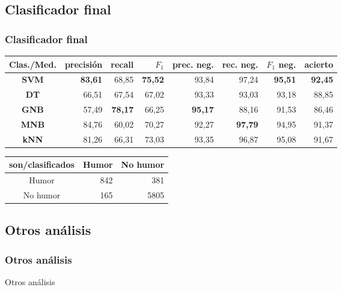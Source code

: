 \subsection{Clasificador final}
\begin{frame}
    \frametitle{Clasificador final}

    \begin{center}
        \scriptsize

        \begin{tabular}{ c | r | r | r | r | r | r | r }
            \textbf{Clas./Med.} & precisión & recall & $F_1$ & prec. neg. & rec. neg. & $F_1$ neg. & acierto \\
            \hline
            \textbf{SVM} & \textbf{83,61} & 68,85 & \textbf{75,52} & 93,84 & 97,24 & \textbf{95,51} & \textbf{92,45} \\
            \hline
            \textbf{DT} & 66,51 & 67,54 & 67,02 & 93,33 & 93,03 & 93,18 & 88,85 \\
            \hline
            \textbf{GNB} & 57,49 & \textbf{78,17} & 66,25 & \textbf{95,17} & 88,16 & 91,53 & 86,46 \\
            \hline
            \textbf{MNB} & 84,76 & 60,02 & 70,27 & 92,27 & \textbf{97,79} & 94,95 & 91,37 \\
            \hline
            \textbf{kNN} & 81,26 & 66,31 & 73,03 & 93,35 & 96,87 & 95,08 & 91,67 \\
        \end{tabular}

        \vfill

        \begin{tabular}{ c | r | r }
            \textbf{son/clasificados} & Humor & No humor \\
            \hline
            Humor & 842 & 381 \\
            \hline
            No humor & 165 & 5805 \\
        \end{tabular}
    \end{center}
\end{frame}

\subsection{Otros análisis}
\begin{frame}
    \frametitle{Otros análisis}

    Otros análisis
\end{frame}
